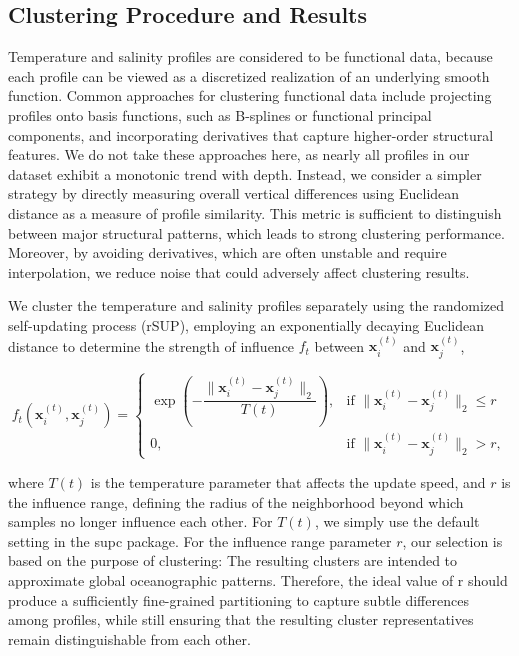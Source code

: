 \documentclass[11pt]{article}
\theoremstyle{plain}
\begin{document}
\subsection{Clustering Procedure and Results}
Temperature and salinity profiles are considered to be functional data, because each profile can be viewed as a discretized realization of an underlying smooth function. Common approaches for clustering functional data include projecting profiles onto basis functions, such as B-splines or functional principal components, and incorporating derivatives that capture higher-order structural features. We do not take these approaches here, as nearly all profiles in our dataset exhibit a monotonic trend with depth. Instead, we consider a simpler strategy by directly measuring overall vertical differences using Euclidean distance as a measure of profile similarity. This metric is sufficient to distinguish between major structural patterns, which leads to strong clustering performance. Moreover, by avoiding derivatives, which are often unstable and require interpolation, we reduce noise that could adversely affect clustering results. 

We cluster the temperature and salinity profiles separately using the randomized self-updating process (rSUP), employing an exponentially decaying Euclidean distance to determine the strength of influence $f_t$ between $\mathbf{x}_i^{(t)}$ and $\mathbf{x}_j^{(t)}$,

\begin{equation}
f_t\left( \mathbf{x}_i^{(t)}, \mathbf{x}_j^{(t)} \right) =
\begin{cases}
\exp\left( -\dfrac{ \|\mathbf{x}_i^{(t)}-\mathbf{x}_j^{(t)} \|_2}{ T(t) } \right), & \text{if }  \|\mathbf{x}_i^{(t)}-\mathbf{x}_j^{(t)} \|_2 \leq r \\
0, & \text{if } \|\mathbf{x}_i^{(t)}-\mathbf{x}_j^{(t)} \|_2 > r, \nonumber
\end{cases}
\end{equation}

\noindent where $T(t)$ is the temperature parameter that affects the update speed, and $r$ is the influence range, defining the radius of the neighborhood beyond which samples no longer influence each other. For $T(t)$, we simply use the default setting in the supc package. For the influence range parameter $r$, our selection is based on the purpose of clustering: The resulting clusters are intended to approximate global oceanographic patterns. Therefore, the ideal value of r should produce a sufficiently fine-grained partitioning to capture subtle differences among profiles, while still ensuring that the resulting cluster representatives remain distinguishable from each other.
\end{document}
